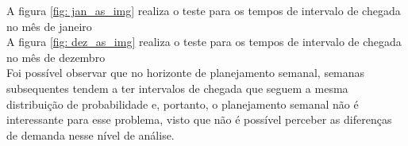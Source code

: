 A figura \ref*{fig: jan_as_img} realiza o teste para os tempos de intervalo de chegada no mês de janeiro\\
A figura \ref*{fig: dez_as_img} realiza o teste para os tempos de intervalo de chegada no mês de dezembro\\
Foi possível observar que no horizonte de planejamento semanal, semanas subsequentes tendem a ter intervalos de chegada que seguem a mesma distribuição de probabilidade e, portanto, o planejamento semanal não é interessante para esse problema, visto que não é possível perceber as diferenças de demanda nesse nível de análise.